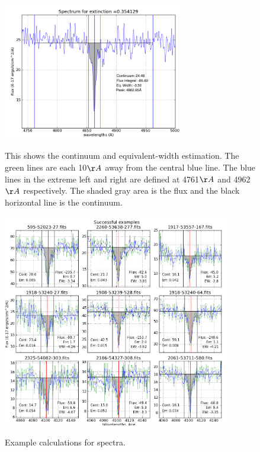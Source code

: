 \documentclass[preprint]{aastex}
\begin{document}
\begin{figure}
\includegraphics[width=8cm]{workingexample}\\
\caption{This shows the continuum and equivalent-width estimation. The green lines are each 10$\AA$  away from the central blue line. The blue lines in the extreme left and right are defined at 4761$\AA$ and 4962$\AA$  respectively. The shaded gray area is the flux and the black horizontal line is the continuum.}
\end{figure}
\begin{figure}
\includegraphics[width=10cm]{success_labeled}\\
\caption{Example calculations for spectra.}
\end{figure}
\end{document}

